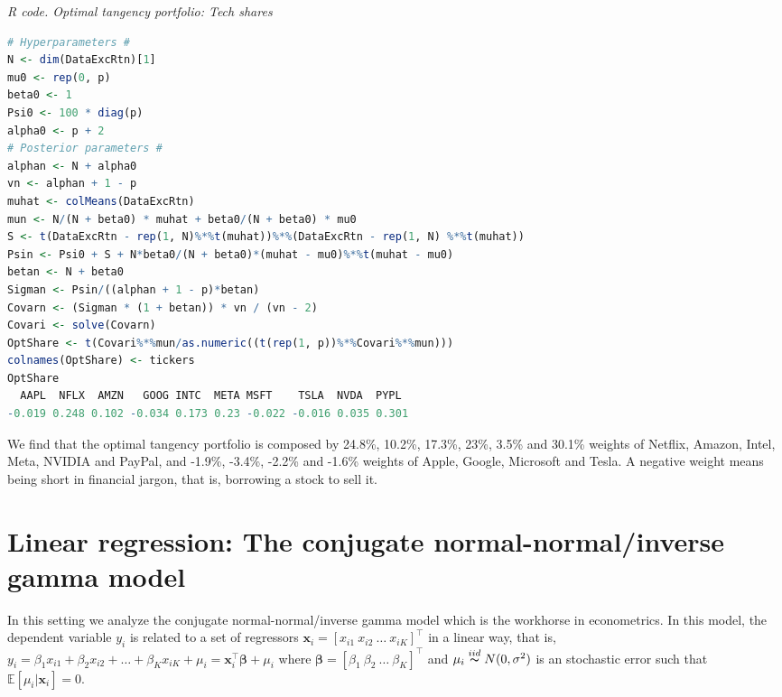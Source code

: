 \begin{enumerate}
\begin{tcolorbox}[enhanced,width=4.67in,center upper,
	fontupper=\large\bfseries,drop shadow southwest,sharp corners]
	\textit{R code. Optimal tangency portfolio: Tech shares}
\begin{VF}
\begin{lstlisting}[language=R]
# Hyperparameters #
N <- dim(DataExcRtn)[1]
mu0 <- rep(0, p)
beta0 <- 1
Psi0 <- 100 * diag(p)
alpha0 <- p + 2
# Posterior parameters #
alphan <- N + alpha0
vn <- alphan + 1 - p
muhat <- colMeans(DataExcRtn)
mun <- N/(N + beta0) * muhat + beta0/(N + beta0) * mu0
S <- t(DataExcRtn - rep(1, N)%*%t(muhat))%*%(DataExcRtn - rep(1, N) %*%t(muhat)) 
Psin <- Psi0 + S + N*beta0/(N + beta0)*(muhat - mu0)%*%t(muhat - mu0)
betan <- N + beta0
Sigman <- Psin/((alphan + 1 - p)*betan)
Covarn <- (Sigman * (1 + betan)) * vn / (vn - 2)
Covari <- solve(Covarn)
OptShare <- t(Covari%*%mun/as.numeric((t(rep(1, p))%*%Covari%*%mun)))
colnames(OptShare) <- tickers
OptShare
  AAPL  NFLX  AMZN   GOOG INTC  META MSFT    TSLA  NVDA  PYPL
-0.019 0.248 0.102 -0.034 0.173 0.23 -0.022 -0.016 0.035 0.301
\end{lstlisting}
\end{VF}
\end{tcolorbox}

We find that the optimal tangency portfolio is composed by 24.8\%, 10.2\%, 17.3\%, 23\%, 3.5\% and 30.1\% weights of Netflix, Amazon, Intel, Meta, NVIDIA and PayPal, and -1.9\%, -3.4\%, -2.2\% and -1.6\% weights of Apple, Google, Microsoft and Tesla. A negative weight means being short in financial jargon, that is, borrowing a stock to sell it.
\end{enumerate}


\section{Linear regression: The conjugate normal-normal/inverse gamma model}\label{sec43}

In this setting we analyze the conjugate normal-normal/inverse gamma model which is the workhorse in econometrics. In this model, the dependent variable $y_i$ is related to a set of regressors ${\bm{x}}_i=[x_{i1} \ x_{i2} \ \ldots \ x_{iK}]^{\top}$ in a linear way, that is, $y_i=\beta_1x_{i1}+\beta_2x_{i2}+\ldots+\beta_Kx_{iK}+\mu_i={\bm{x}}_i^{\top}\bm{\beta}+\mu_i$ where $\bm{\beta}=[\beta_1 \ \beta_2 \ \ldots \ \beta_K]^{\top}$ and $\mu_i\stackrel{iid} {\thicksim}N(0,\sigma^2)$ is an stochastic error such that $\mathbb{E}[\mu_i|{\bm{x}}_i]=0$.

